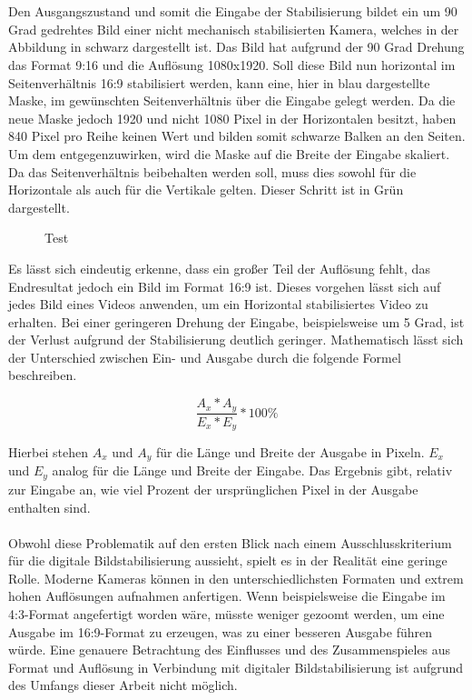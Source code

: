     \\ \\
    Den Ausgangszustand und somit die Eingabe der Stabilisierung bildet ein um 90 Grad gedrehtes Bild einer nicht mechanisch stabilisierten Kamera, welches in der Abbildung in schwarz dargestellt ist. Das Bild hat aufgrund der 90 Grad Drehung das Format 9:16 und die Auflösung 1080x1920. Soll diese Bild nun horizontal im Seitenverhältnis 16:9 stabilisiert werden, kann eine, hier in blau dargestellte Maske, im gewünschten Seitenverhältnis über die Eingabe gelegt werden. Da die neue Maske jedoch 1920 und nicht 1080 Pixel in der Horizontalen besitzt, haben 840 Pixel pro Reihe keinen Wert und bilden somit schwarze Balken an den Seiten. Um dem entgegenzuwirken, wird die Maske auf die Breite der Eingabe skaliert. Da das Seitenverhältnis beibehalten werden soll, muss dies sowohl für die Horizontale als auch für die Vertikale gelten. Dieser Schritt ist in Grün dargestellt.



\newpage

\begin{figure}[h]
    \centering
    \def\svgwidth{\linewidth}
    
    \vspace{0.5cm}
    \caption{Test}
    \label{vektorgrafik}
\end{figure}

    Es lässt sich eindeutig erkenne, dass ein großer Teil der Auflösung fehlt, das Endresultat jedoch ein Bild im Format 16:9 ist. Dieses vorgehen lässt sich auf jedes Bild eines Videos anwenden, um ein Horizontal stabilisiertes Video zu erhalten. Bei einer geringeren Drehung der Eingabe, beispielsweise um 5 Grad, ist der Verlust aufgrund der Stabilisierung deutlich geringer. Mathematisch lässt sich der Unterschied zwischen Ein- und Ausgabe durch die folgende Formel beschreiben.

\begin{equation}
    \frac{A_x*A_y}{E_x*E_y}*100\%
\end{equation}


    Hierbei stehen $A_x$ und $A_y$ für die Länge und Breite der Ausgabe in Pixeln. $E_x$ und $E_y$ analog für die Länge und Breite der Eingabe. Das Ergebnis gibt, relativ zur Eingabe an, wie viel Prozent der ursprünglichen Pixel in der Ausgabe enthalten sind.
    \\ \\
    Obwohl diese Problematik auf den ersten Blick nach einem Ausschlusskriterium für die digitale Bildstabilisierung aussieht, spielt es in der Realität eine geringe Rolle. Moderne Kameras können in den unterschiedlichsten Formaten und extrem hohen Auflösungen aufnahmen anfertigen. Wenn beispielsweise die Eingabe im 4:3-Format angefertigt worden wäre, müsste weniger gezoomt werden, um eine Ausgabe im 16:9-Format zu erzeugen, was zu einer besseren Ausgabe führen würde. Eine genauere Betrachtung des Einflusses und des Zusammenspieles aus Format und Auflösung in Verbindung mit digitaler Bildstabilisierung ist aufgrund des Umfangs dieser Arbeit nicht möglich.